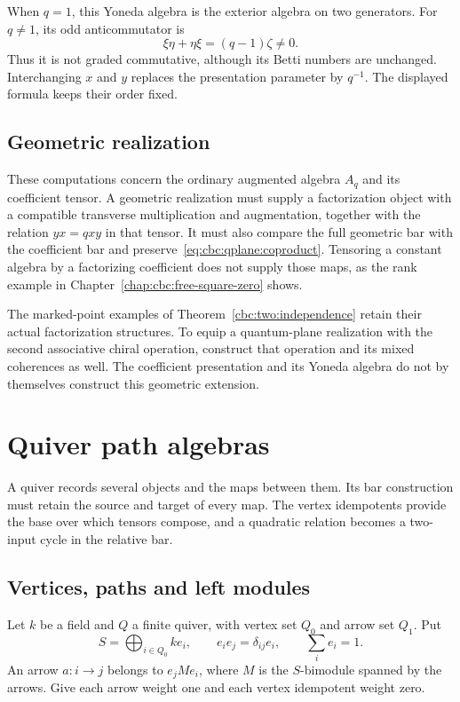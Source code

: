 When $q=1$, this Yoneda algebra is the exterior algebra on two generators.
For $q\ne1$, its odd anticommutator is
\[
 \xi\eta+\eta\xi=(q-1)\zeta\ne0.
\]
Thus it is not graded commutative, although its Betti numbers are unchanged.
Interchanging $x$ and $y$ replaces the presentation parameter by $q^{-1}$.
The displayed formula keeps their order fixed.

\section{Geometric realization}

These computations concern the ordinary augmented algebra $A_q$ and its coefficient tensor.
A geometric realization must supply a factorization object with a compatible transverse multiplication and augmentation, together with the relation $yx=qxy$ in that tensor.
It must also compare the full geometric bar with the coefficient bar and preserve~\eqref{eq:cbc:qplane:coproduct}.
Tensoring a constant algebra by a factorizing coefficient does not supply those maps, as the rank example in Chapter~\ref{chap:cbc:free-square-zero} shows.

The marked-point examples of Theorem~\ref{cbc:two:independence} retain their actual factorization structures.
To equip a quantum-plane realization with the second associative chiral operation, construct that operation and its mixed coherences as well.
The coefficient presentation and its Yoneda algebra do not by themselves construct this geometric extension.

\chapter{Quiver path algebras}\label{chap:cbc:quivers}
A quiver records several objects and the maps between them.
Its bar construction must retain the source and target of every map.
The vertex idempotents provide the base over which tensors compose, and a quadratic relation becomes a two-input cycle in the relative bar.

\section{Vertices, paths and left modules}

Let $k$ be a field and $Q$ a finite quiver, with vertex set $Q_0$ and arrow set $Q_1$.
Put
\[
 S=\bigoplus_{i\in Q_0}ke_i,\qquad
 e_ie_j=\delta_{ij}e_i,\qquad \sum_i e_i=1.
\]
An arrow $a:i\to j$ belongs to $e_jMe_i$, where $M$ is the $S$-bimodule spanned by the arrows.
Give each arrow weight one and each vertex idempotent weight zero.

